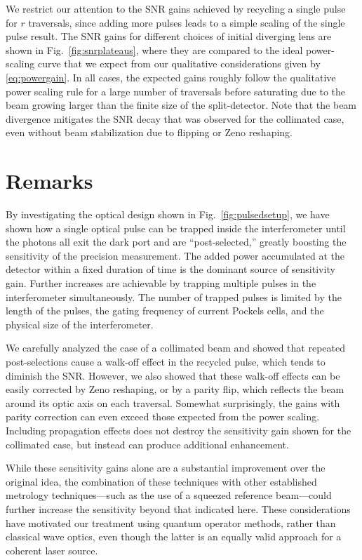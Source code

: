 We restrict our attention to the SNR gains achieved by recycling a single pulse for $r$ traversals, since adding more pulses leads to a simple scaling of the single pulse result. The SNR gains for different choices of initial diverging lens are shown in Fig.~\ref{fig:snrplateaus}, where they are compared to the ideal power-scaling curve that we expect from our qualitative considerations given by \eqref{eq:powergain}.  In all cases, the expected gains roughly follow the qualitative power scaling rule for a large number of traversals before saturating due to the beam growing larger than the finite size of the split-detector.  Note that the beam divergence mitigates the SNR decay that was observed for the collimated case, even without beam stabilization due to flipping or Zeno reshaping.

\section{Remarks}\label{sec:conclusion}
By investigating the optical design shown in Fig.~\ref{fig:pulsedsetup}, we have shown how a single optical pulse can be trapped inside the interferometer until the photons all exit the dark port and are ``post-selected,'' greatly boosting the sensitivity of the precision measurement.  The added power accumulated at the detector within a fixed duration of time is the dominant source of sensitivity gain.  Further increases are achievable by trapping multiple pulses in the interferometer simultaneously.  The number of trapped pulses is limited by the length of the pulses, the gating frequency of current Pockels cells, and the physical size of the interferometer.

We carefully analyzed the case of a collimated beam and showed that repeated post-selections cause a walk-off effect in the recycled pulse, which tends to diminish the SNR.  However, we also showed that these walk-off effects can be easily corrected by Zeno reshaping, or by a parity flip, which reflects the beam around its optic axis on each traversal.  Somewhat surprisingly, the gains with parity correction can even exceed those expected from the power scaling.  Including propagation effects does not destroy the sensitivity gain shown for the collimated case, but instead can produce additional enhancement.  

While these sensitivity gains alone are a substantial improvement over the original idea, the combination of these techniques with other established metrology techniques---such as the use of a squeezed reference beam---could further increase the sensitivity beyond that indicated here.  These considerations have motivated our treatment using quantum operator methods, rather than classical wave optics, even though the latter is an equally valid approach for a coherent laser source.

